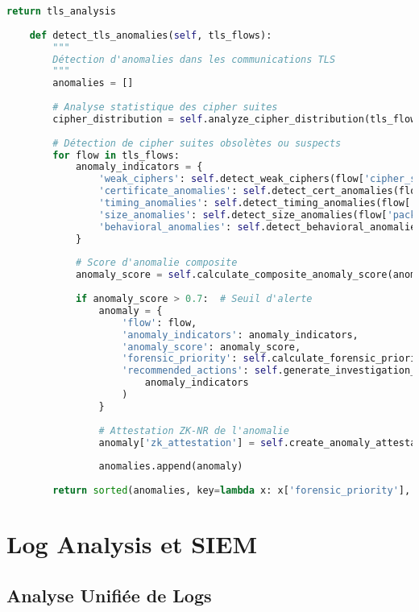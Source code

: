\begin{lstlisting}[language=Python, caption=Analyseur de trafic TLS avec détection post-quantique]
        return tls_analysis
    
    def detect_tls_anomalies(self, tls_flows):
        """
        Détection d'anomalies dans les communications TLS
        """
        anomalies = []
        
        # Analyse statistique des cipher suites
        cipher_distribution = self.analyze_cipher_distribution(tls_flows)
        
        # Détection de cipher suites obsolètes ou suspects
        for flow in tls_flows:
            anomaly_indicators = {
                'weak_ciphers': self.detect_weak_ciphers(flow['cipher_suite']),
                'certificate_anomalies': self.detect_cert_anomalies(flow['certificates']),
                'timing_anomalies': self.detect_timing_anomalies(flow['handshake_timing']),
                'size_anomalies': self.detect_size_anomalies(flow['packet_sizes']),
                'behavioral_anomalies': self.detect_behavioral_anomalies(flow)
            }
            
            # Score d'anomalie composite
            anomaly_score = self.calculate_composite_anomaly_score(anomaly_indicators)
            
            if anomaly_score > 0.7:  # Seuil d'alerte
                anomaly = {
                    'flow': flow,
                    'anomaly_indicators': anomaly_indicators,
                    'anomaly_score': anomaly_score,
                    'forensic_priority': self.calculate_forensic_priority(anomaly_score),
                    'recommended_actions': self.generate_investigation_recommendations(
                        anomaly_indicators
                    )
                }
                
                # Attestation ZK-NR de l'anomalie
                anomaly['zk_attestation'] = self.create_anomaly_attestation(anomaly)
                
                anomalies.append(anomaly)
                
        return sorted(anomalies, key=lambda x: x['forensic_priority'], reverse=True)
\end{lstlisting}

\section{Log Analysis et SIEM}

\subsection{Analyse Unifiée de Logs}

